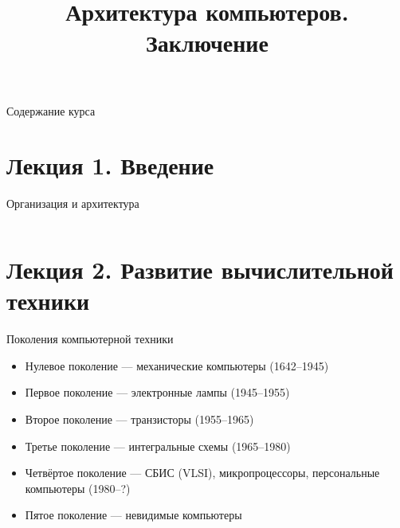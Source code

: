 \newcommand{\h}{%
handout,%
}



\usepackage{multicol}

\title[Архитектура компьютеров. Заключение]{Архитектура компьютеров. Заключение}


\newcommand{\LRA}{$\leftrightarrow$}




\begin{frame}
\titlepage
\end{frame}

\begin{frame}{Содержание курса}
\small
\begin{multicols}{2}
  \tableofcontents
\end{multicols}
\end{frame}


\section{Лекция 1. Введение}
\begin{frame}{Организация и архитектура}
\begin{columns}
	\column{6cm}

	\column{6cm}
\end{columns}
\end{frame}

\section{Лекция 2. Развитие вычислительной техники}


\begin{frame}{Поколения компьютерной техники}
\begin{itemize}
    \item Нулевое поколение — механические компьютеры (1642–1945)
    \item Первое поколение — электронные лампы (1945–1955)
    \item Второе поколение — транзисторы (1955–1965)
    \item Третье поколение — интегральные схемы (1965–1980)
    \item Четвёртое поколение — СБИС (VLSI), микропроцессоры, персональные компьютеры (1980–?)
    \item Пятое поколение — невидимые компьютеры
\end{itemize}
\end{frame}

